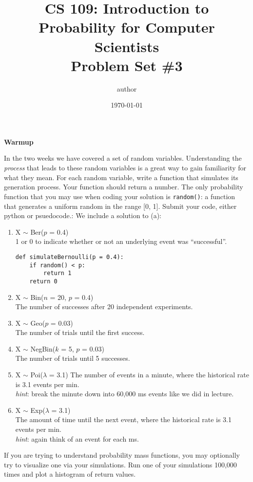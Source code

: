 \documentclass[12pt]{article}
\title{CS 109: Introduction to Probability for Computer Scientists\\Problem Set \#3}
\author{\Large{author}} %
\date{\Large{\today}} %
\renewcommand{\(}{\left(}
\renewcommand{\)}{\right)}
\theoremstyle{definition}
\begin{document}
\maketitle
 

\textbf{\large{Warmup}}
\begin{enumerate}
\large{
    \item In the two weeks we have covered a set of random variables. Understanding the \textit{process} that leads to these random variables is a great way to gain familiarity for what they mean. For each random variable, write a function that simulates its generation process. Your function should return a number. The only probability function that you may use when coding your solution is \texttt{random()}: a function that generates a uniform random in the range [0, 1]. Submit your code, either python or psuedocode.: We include a solution to (a):

    \begin{enumerate}
        \item X $\sim$ Ber($p$ = 0.4)\\
        1 or 0 to indicate whether or not an underlying event was ``successful''.
\begin{verbatim}
def simulateBernoulli(p = 0.4):
    if random() < p:
        return 1
    return 0
\end{verbatim}
        \item X $\sim$ Bin($n$ = 20, $p$ = 0.4)\\
        The number of successes after 20 independent experiments.
        \item X $\sim$ Geo($p$ = 0.03)\\
        The number of trials until the first success.
        \item X $\sim$ NegBin($k$ = 5, $p$ = 0.03)\\
        The number of trials until 5 successes.
        \item X $\sim$ Poi($\lambda$ = 3.1) The number of events in a minute, where the historical rate is 3.1 events per min.\\ \textit{hint}: break the minute down into 60,000 ms events like we did in lecture.
        \item X $\sim$ Exp($\lambda$ = 3.1)\\
        The amount of time until the next event, where the historical rate is 3.1 events per min.\\
        \textit{hint}: again think of an event for each ms.
    \end{enumerate}
    If you are trying to understand probability mass functions, you may optionally try to visualize one via your simulations. Run one of your simulations 100,000 times and plot a histogram of return values.
    
}
\end{enumerate}
\end{document}
